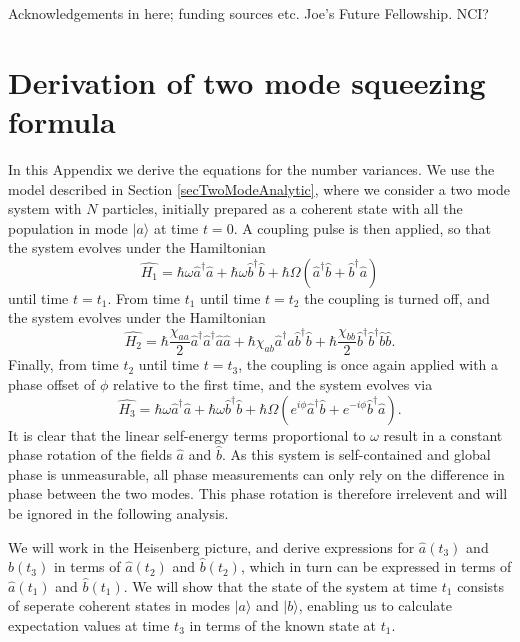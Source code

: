 \documentclass{iopart}
\begin{document}
\ack
Acknowledgements in here; funding sources etc.  Joe's Future Fellowship.  NCI?

\clearpage

\appendix
\section{Derivation of two mode squeezing formula}
\label{appendixTwoModeDerivation}
In this Appendix we derive the equations for the number variances. We use the model described in Section \ref{secTwoModeAnalytic}, where we consider a two mode system with $N$ particles, initially prepared as a coherent state with all the population in mode $|a\rangle$ at time $t=0$. A coupling pulse is then applied, so that the system evolves under the Hamiltonian
\begin{equation}
\hat{H_1} = \hbar \omega \hat{a}^{\dagger} \hat{a} +  \hbar \omega \hat{b}^{\dagger} \hat{b} 
          + \hbar \Omega (\hat{a}^{\dagger} \hat{b} + \hat{b}^{\dagger} \hat{a} )
\end{equation}
until time $t=t_1$. From time $t_1$ until time $t=t_2$ the coupling is turned off, and the system evolves under the Hamiltonian
\begin{equation}
\hat{H_2} = \hbar\frac{\chi_{aa}}{2} \hat{a}^{\dagger} \hat{a}^{\dagger} \hat{a} \hat{a}
          + \hbar\chi_{ab} \hat{a}^{\dagger} \hat{a} \hat{b}^{\dagger} \hat{b}
          + \hbar\frac{\chi_{bb}}{2} \hat{b}^{\dagger} \hat{b}^{\dagger} \hat{b} \hat{b}.
\end{equation}
Finally, from time $t_2$ until time $t=t_3$, the coupling is once again applied with a phase offset of $\phi$ relative to the first time, and the system evolves via
\begin{equation}
\hat{H_3} = \hbar \omega \hat{a}^{\dagger} \hat{a} +  \hbar \omega \hat{b}^{\dagger} \hat{b}
          + \hbar\Omega (e^{i\phi} \hat{a}^{\dagger} \hat{b} + e^{-i\phi} \hat{b}^{\dagger} \hat{a} ).
\end{equation}
It is clear that the linear self-energy terms proportional to $\omega$ result in a constant phase rotation of the fields $\hat{a}$ and $\hat{b}$. As this system is self-contained and global phase is unmeasurable, all phase measurements can only rely on the difference in phase between the two modes. This phase rotation is therefore irrelevent and will be ignored in the following analysis.

We will work in the Heisenberg picture, and derive expressions for $\hat{a}(t_3)$ and $\hat{b}(t_3)$ in terms of $\hat{a}(t_2)$ and $\hat{b}(t_2)$, which in turn can be expressed in terms of $\hat{a}(t_1)$ and $\hat{b}(t_1)$. We will show that the state of the system at time $t_1$ consists of seperate coherent states in modes $|a\rangle$ and $|b\rangle$, enabling us to calculate expectation values at time $t_3$ in terms of the known state at $t_1$.
\end{document}
